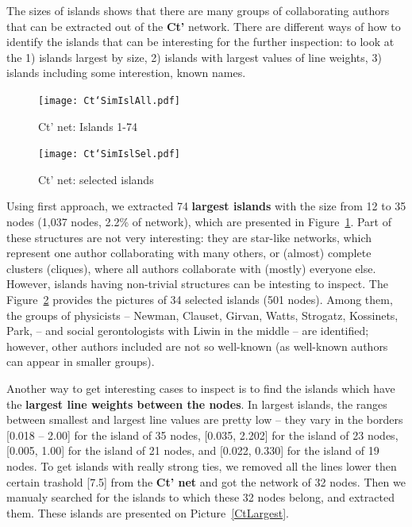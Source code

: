 \documentclass[11pt]{article} %
\begin{document}
The sizes of islands shows that there are many groups of collaborating authors that can be extracted out of the \textbf{Ct'} network. There are different ways of how to identify the islands that can be interesting for the further inspection: to look at the 1) islands largest by size, 2) islands with largest values of line weights, 3) islands including some interestion, known names.  \medskip

\begin{figure}
\begin{center}
\texttt{[image: Ct`SimIslAll.pdf]}
\end{center}
\caption{Ct' net: Islands 1-74} \label{CtIslAll}
\end{figure}

\begin{figure}
\begin{center}
\texttt{[image: Ct`SimIslSel.pdf]}
\end{center}
\caption{Ct' net: selected islands} \label{CtIsSelect}
\end{figure}

Using first approach, we extracted 74 \textbf{largest islands} with the size from 12 to 35 nodes (1,037 nodes, 2.2\% of network), which are presented in Figure~\ref{CtIslAll}. Part of these structures are not very interesting: they are star-like networks, which represent one author collaborating with many others, or (almost) complete clusters (cliques), where all authors collaborate with (mostly) everyone else. However, islands having non-trivial structures can be intesting to inspect. The Figure~\ref{CtIsSelect} provides the pictures of 34 selected islands (501 nodes). Among them, the groups of physicists -- Newman, Clauset, Girvan, Watts, Strogatz, Kossinets, Park, --  and social gerontologists with Liwin in the middle -- are identified; however, other authors included are not so well-known (as well-known authors can appear in smaller groups). \medskip 

Another way to get interesting cases to inspect is to find the islands which have the \textbf{largest line weights between the nodes}. In largest islands, the ranges between smallest and largest line values are pretty low -- they vary in the borders [0.018 -- 2.00] for the island of 35 nodes, [0.035, 2.202] for the island of 23 nodes, [0.005, 1.00] for the island of 21 nodes, and [0.022, 0.330] for the island of 19 nodes. To get islands with really strong ties, we removed all the lines lower then certain trashold [7.5] from the \textbf{Ct' net} and got the network of 32 nodes. Then we manualy searched for the islands to which these 32 nodes belong, and extracted them. These islands are presented on Picture~\ref{CtLargest}. \medskip 
\end{document}
